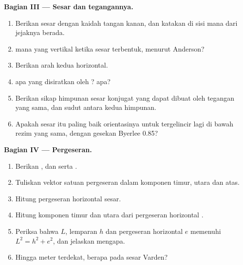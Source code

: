 \begin{problem}
\medskip
\noindent\textbf{Bagian III --- Sesar dan tegangannya.}
\begin{enumerate}[resume]
  \item Berikan  sesar dengan kaidah tangan kanan, dan katakan di sisi mana dari jejaknya  berada.
  \item {} mana yang vertikal ketika sesar terbentuk, menurut Anderson?
  \item Berikan arah kedua  horizontal.
  \item {} apa yang disiratkan oleh ?  apa?
  \item Berikan sikap himpunan sesar konjugat yang dapat dibuat oleh tegangan yang sama, dan sudut antara kedua himpunan.
  \item Apakah sesar itu paling baik orientasinya untuk tergelincir lagi di bawah rezim yang sama, dengan gesekan Byerlee 0.85?
\end{enumerate}

\medskip
\noindent\textbf{Bagian IV --- Pergeseran.}
\begin{enumerate}[resume]
  \item Berikan  , dan  serta .
  \item Tuliskan vektor satuan pergeseran dalam komponen timur, utara dan atas.
  \item Hitung pergeseran horizontal sesar.
  \item Hitung komponen timur dan utara dari pergeseran horizontal .
  \item Periksa bahwa  $L$, lemparan $h$ dan pergeseran horizontal $e$ memenuhi $L^2 = h^2 + e^2$, dan jelaskan mengapa.
  \item Hingga meter terdekat, berapa  pada sesar Varden?
\end{enumerate}
\end{problem}

